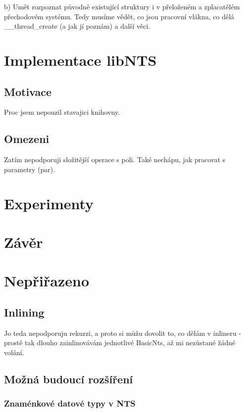 \documentclass[10pt,a4paper,notitlepage]{report}
\begin{document}
b) Umět rozpoznat původně existující struktury i v přeloženém a zplacatělém přechodovém systému. Tedy musíme vědět, co jsou pracovní vlákna, co dělá \_\_thread\_create (a jak jí poznám) a další věci.


\chapter{Implementace libNTS}
\section{Motivace}
Proc jsem nepouzil stavajici knihovny.
\section{Omezeni}
Zatím nepodporuji složitější operace s poli. Také nechápu, jak pracovat s parametry (par).


\chapter{Experimenty}


\chapter{Závěr}



\chapter{Nepřiřazeno}
\section{Inlining}
Jo teda nepodporuju rekurzi, a proto si můžu dovolit to, co dělám v inlineru - prostě tak dlouho zainlinovávám jednotlivé BasicNts, až mi nezůstané žádné volání.

\section{Možná budoucí rozšíření}

\subsection{Znaménkové datové typy v NTS}


\tableofcontents

\printbibliography
\end{document}
